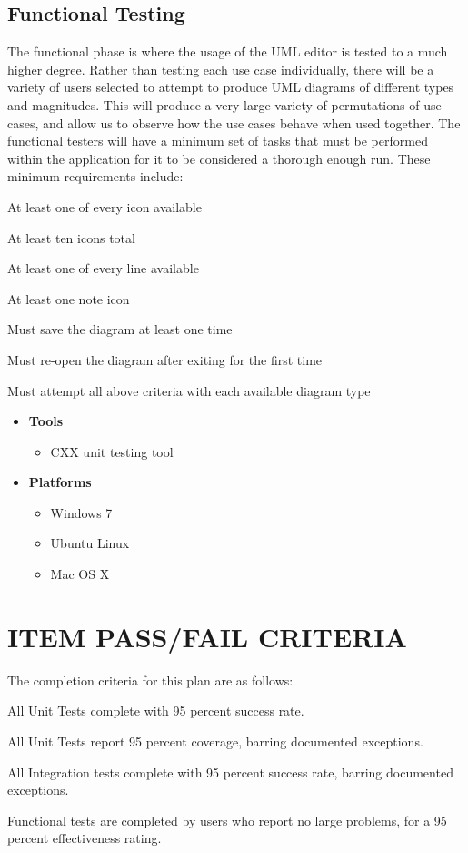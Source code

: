 \documentclass[twoside,letterpaper]{article}
\begin{document}
{\subsection{Functional Testing}
The functional phase is where the usage of the UML editor is tested to a much higher degree. Rather than testing each use case individually, there will be a variety of users selected to attempt to produce UML diagrams of different types and magnitudes. This will produce a very large variety of permutations of use cases, and allow us to observe how the use cases behave when used together.
The functional testers will have a minimum set of tasks that must be performed within the application for it to be considered a thorough enough run. These minimum requirements include:
\begin{list}{-}{ }
\item At least one of every icon available
\item At least ten icons total
\item At least one of every line available
\item At least one note icon
\item Must save the diagram at least one time
\item Must re-open the diagram after exiting for the first time
\item Must attempt all above criteria with each available diagram type
\end{list}
\begin{itemize}
\item \textbf{Tools}
\begin{itemize}
\item CXX unit testing tool
\end{itemize}
\item \textbf{Platforms}
\begin{itemize}
\item Windows 7
\item Ubuntu Linux
\item Mac OS X
\end{itemize}
\end{itemize}
}

\section[ITEM PASS/FAIL CRITERIA]{\bfseries\color{black}
	 ITEM PASS/FAIL CRITERIA}
{\color{black}
The completion criteria for this plan are as follows:
\begin{list}{-}{ }
\item All Unit Tests complete with 95 percent success rate.
\item All Unit Tests report 95 percent coverage, barring documented exceptions. 
\item All Integration tests complete with 95 percent success rate, barring documented exceptions.
\item Functional tests are completed by users who report no large problems, for a 95 percent effectiveness rating. 
\end{list}
}
\end{document}
